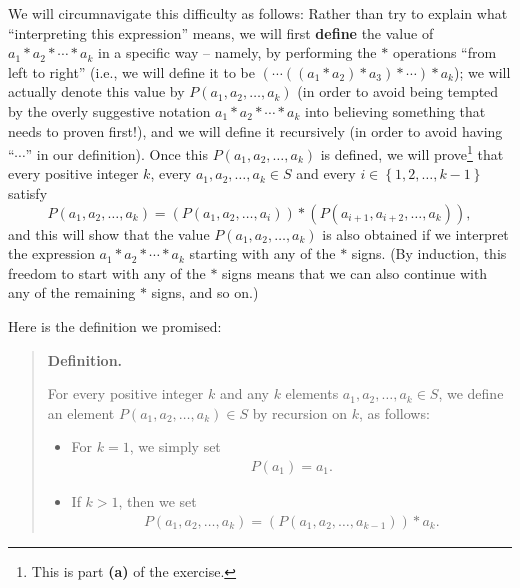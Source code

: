 \documentclass[paper=a4, fontsize=12pt]{scrartcl} %
\newcommand{\set}[1]{\left\{ #1 \right\}}
\newcommand{\tup}[1]{\left( #1 \right)}
\theoremstyle{plainsl}
\theoremstyle{definition}
\theoremstyle{remark}
\newenvironment{statement}{\begin{quote}}{\end{quote}}
\begin{document}
We will circumnavigate this difficulty as follows:
Rather than try to explain what ``interpreting this
expression'' means, we will first \textbf{define} the value
of $a_1 * a_2 * \cdots * a_k$ in a specific way -- namely,
by performing the $*$ operations ``from left to right''
(i.e., we will define it to be
$\tup{ \cdots \tup{\tup{a_1 * a_2} * a_3} * \cdots } * a_k$);
we will actually denote this value by
$P \tup{a_1, a_2, \ldots, a_k}$ (in order to avoid being
tempted by the overly suggestive notation
$a_1 * a_2 * \cdots * a_k$
into believing something that needs to proven first!),
and we will define it recursively (in order to avoid having
``$\cdots$'' in our definition).
Once this $P \tup{a_1, a_2, \ldots, a_k}$ is defined,
we will prove\footnote{This is part \textbf{(a)} of the
exercise.} that
every positive integer $k$, every $a_1, a_2, \ldots, a_k \in S$
and every $i \in \set{1, 2, \ldots, k-1}$ satisfy
\[
P \tup{a_1, a_2, \ldots, a_k}
= \tup{P \tup{a_1, a_2, \ldots, a_i}}
     * \tup{P \tup{a_{i+1}, a_{i+2}, \ldots, a_k}} ,
\]
and this will show that the value
$P \tup{a_1, a_2, \ldots, a_k}$
is also obtained if we interpret the expression
$a_1 * a_2 * \cdots * a_k$ starting with any of the $*$
signs.
(By induction, this freedom to start with any of the $*$
signs means that we can also continue with any of the
remaining $*$ signs, and so on.)

Here is the definition we promised:

\begin{statement}
\textbf{Definition.}

For every positive integer $k$ and any $k$ elements
$a_1, a_2, \ldots, a_k \in S$, we define an element
$P \tup{a_1, a_2, \ldots, a_k} \in S$ by recursion on $k$,
as follows:

\begin{itemize}

\item For $k = 1$, we simply set
\begin{align}
P \tup{a_1} = a_1 .
\label{eq.exe.gen-ass.Pa1}
\end{align}

\item If $k > 1$, then we set
\begin{align}
P \tup{a_1, a_2, \ldots, a_k}
= \tup{P \tup{a_1, a_2, \ldots, a_{k-1}}} * a_k .
\label{eq.exe.gen-ass.Pa2}
\end{align}

\end{itemize}
\end{statement}
\end{document}
